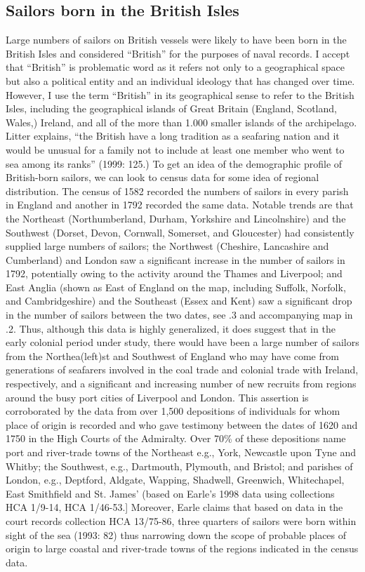 \subsection{{Sailors} {born} {in} {the} {British} {Isles} }%


Large numbers of sailors on British vessels were likely to have been born in the British Isles and considered “British” for the purposes of naval records. I accept that “British” is problematic word as it refers not only to a geographical space but also a political entity and an individual ideology that has changed over time. However, I use the term “British” in its geographical sense to refer to the British Isles, including the geographical islands of Great Britain (England, Scotland, Wales,) Ireland, and all of the more than 1.000 smaller islands of the archipelago. Litter explains, “the British have a long tradition as a seafaring nation and it would be unusual for a family not to include at least one member who went to sea among its ranks” (1999: 125.) To get an idea of the demographic profile of British-born sailors, we can look to census data for some idea of regional distribution. The census of 1582 recorded the numbers of sailors in every parish in England \citep[246]{Bicheno2012} and another in 1792 recorded the same data. Notable trends are that the Northeast (Northumberland, Durham, Yorkshire and Lincolnshire) and the Southwest (Dorset, Devon, Cornwall, Somerset, and Gloucester) had consistently supplied large numbers of sailors; the Northwest (Cheshire, Lancashire and Cumberland) and London saw a significant increase in the number of sailors in 1792, potentially owing to the activity around the Thames and Liverpool; and East Anglia (shown as East of England on the map, including Suffolk, Norfolk, and Cambridgeshire) and the Southeast (Essex and Kent) saw a significant drop in the number of sailors between the two dates, see .3 and accompanying map in .2. Thus, although this data is highly generalized, it does suggest that in the early colonial period under study, there would have been a large number of sailors from the Northea(left)st and Southwest of England who may have come from generations of seafarers involved in the coal trade and colonial trade with Ireland, respectively, and a significant and increasing number of new recruits from regions around the busy port cities of Liverpool and London. This assertion is corroborated by the data from over 1,500 depositions of individuals for whom place of origin is recorded and who gave testimony between the dates of 1620 and 1750 in the High Courts of the Admiralty. Over 70\% of these depositions name port and river-trade towns of the Northeast e.g., York, Newcastle upon Tyne and Whitby; the Southwest, e.g., Dartmouth, Plymouth, and Bristol; and parishes of London, e.g., Deptford, Aldgate, Wapping, Shadwell, Greenwich, Whitechapel, East Smithfield and St. James’ (based on Earle’s 1998 data using collections HCA 1/9-14, HCA 1/46-53.] Moreover, Earle claims that based on data in the court records collection HCA 13/75-86, three quarters of sailors were born within sight of the sea (1993: 82) thus narrowing down the scope of probable places of origin to large coastal and river-trade towns of the regions indicated in the census data. 

